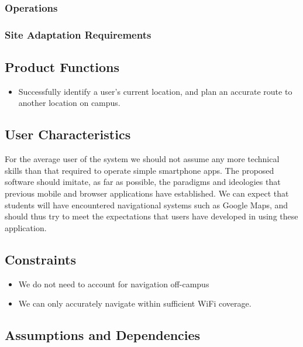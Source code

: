 \documentclass[12pt,a4paper]{article}
\begin{document}
			\subsubsection{Operations}



			\subsubsection{Site Adaptation Requirements}

		\subsection{Product Functions}

			\begin{itemize}
				\item Successfully identify a user's current location, and plan an
							accurate route to another location on campus.
			\end{itemize}

		\subsection{User Characteristics}

			For the average user of the system we should not assume any more technical
			skills than that required to operate simple smartphone apps. The proposed
			software should imitate, as far as possible, the paradigms and ideologies
			that previous mobile and browser applications have established. We can
			expect that students will have encountered navigational systems such as
			Google Maps, and should thus try to meet the expectations that users have
			developed in using these application.

		\subsection{Constraints}

			\begin{itemize}

				\item We do not need to account for navigation off-campus
				\item We can only accurately navigate within sufficient WiFi coverage.

			\end{itemize}

		\subsection{Assumptions and Dependencies}
\end{document}
